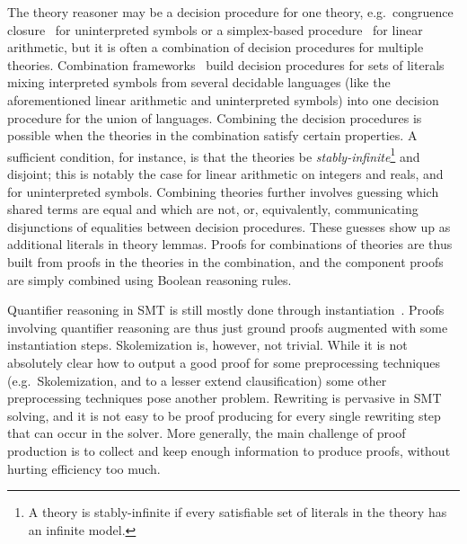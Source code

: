\documentclass{llncs}
\newcommand{\Note}[1]{\textcolor{blue}{[#1]}}
\begin{document}
The theory reasoner may be a decision procedure for one theory, e.g.\ congruence
closure~\cite{Nelson2,Nieuwenhuis6} for uninterpreted symbols or a simplex-based
procedure~\cite{Dutertre1} for linear arithmetic, but it is often a
combination of decision procedures for multiple theories.  Combination
frameworks~\cite{Nelson3,Tinelli1} build decision procedures for sets of
literals mixing interpreted symbols from several decidable languages (like the
aforementioned linear arithmetic and uninterpreted symbols) into one decision
procedure for the union of languages.  Combining the decision procedures is possible
when the theories in the combination satisfy certain properties.  A sufficient
condition, for instance, is that the theories be \emph{stably-infinite}\footnote{A theory
  is stably-infinite if every satisfiable set of literals in the theory has an
  infinite model.} and disjoint; this is notably the case for linear arithmetic
on integers and reals, and for uninterpreted symbols.  Combining theories further
involves guessing which shared terms are equal and which are not, or,
equivalently, communicating disjunctions of equalities between decision
procedures.  These guesses show up as additional literals in theory lemmas.
Proofs for combinations of theories are thus built from proofs in the
theories in the combination, and the component proofs are simply combined using
Boolean reasoning rules.

Quantifier reasoning in SMT is still mostly done through
instantiation~\cite{Moura9}.  Proofs involving quantifier reasoning are thus
just ground proofs augmented with some instantiation steps.  Skolemization is,
however, not trivial.  While it is not absolutely clear how to output a good
proof for some preprocessing techniques (e.g.\ Skolemization, and to a lesser
extend clausification) some other preprocessing techniques pose another problem.
Rewriting is pervasive in SMT solving, and it is not easy to be proof producing
for every single rewriting step that can occur in the solver.  More generally,
the main challenge of proof production is to collect and keep enough information
to produce proofs, without hurting efficiency too much.

\end{document}
